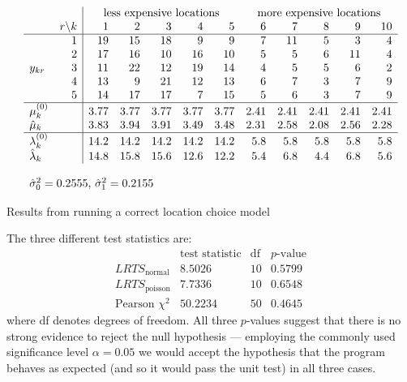 \documentclass{sig-alternate}
\begin{document}
\begin{table}[t]
\[
\begin{array}{lr|rrrrrrrrrr}
&& \multicolumn{5}{c}{\text{less expensive locations}} & \multicolumn{5}{c}{\text{more expensive
      locations}} \\
& r \backslash k& 1 & 2 & 3 & 4 & 5 & 6 & 7 & 8 & 9 & 10 \\\hline
& 1 & 19& 15& 18&  9 & 9 & 7 & 11 & 5 & 3 & 4 \\
& 2 & 17 &16 &10 &16 &10 & 5 & 5 & 6 &11 & 4 \\
y_{kr} & 3 & 11 & 22& 12& 19& 14 & 4 & 5 & 5 & 6 & 2 \\
& 4 & 13 & 9 &21 &12 &13 & 6 & 7 & 3 & 7 & 9 \\
& 5 & 14 &17 &17 & 7 &15 & 5 & 6 & 3 & 7 & 9 \\\hline
\mu_{k}^{(0)} & & 3.77 & 3.77 & 3.77 & 3.77 & 3.77 & 2.41 & 2.41 &2.41
      &2.41 & 2.41\\
\hat{\mu}_{k} & & 3.83 &   3.94 &  3.91 &  3.49 &  3.48 &
  2.31 &  2.58 &  2.08 &  2.56 &  2.28 \\\hline
\lambda_{k}^{(0)} & & 14.2  & 14.2 & 14.2 & 14.2 & 14.2
& 5.8 &  5.8 &  5.8 &  5.8 &  5.8\\
\hat{\lambda}_{k} & & 14.8 &  15.8 &  15.6 &  12.6 &  12.2 &
   5.4 &    6.8 &   4.4 &    6.8 &   5.6 \\
\\
\multicolumn{12}{l}{\hat{\sigma}_0^2=0.2555$, $\hat{\sigma}_1^2=0.2155}
\end{array}
\]

\caption{Results from running a correct location choice model}
\label{good-results-table}
\end{table}

The three different test statistics are:
\[
\begin{array}{l|rrr}
& \text{test statistic} &\text{df} & p\text{-value} \\\hline
LRTS_{\text{normal}} & 8.5026 & 10 & 0.5799 \\
LRTS_{\text{poisson}} & 7.7336 & 10 & 0.6548 \\
\text{Pearson } \chi^2 & 50.2234 & 50 & 0.4645
\end{array}
\]
where df denotes degrees of freedom.  All three $p$-values suggest that there
is no strong evidence to reject the null hypothesis --- employing the commonly
used significance level $\alpha=0.05$ we would accept the hypothesis that the
program behaves as expected (and so it would pass the unit test) in all three cases.
\end{document}
